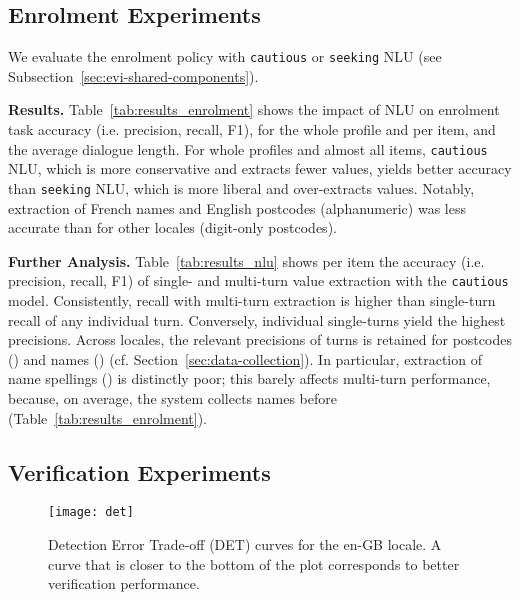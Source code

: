 \documentclass[11pt]{article}
\newcommand{\rparagraph}[1]{\vspace{1.4mm}\noindent\textbf{#1.}}
\begin{document}
{\subsection{Enrolment Experiments}
\label{sec:enrolment-experiments}


We evaluate the enrolment policy with \texttt{cautious} or \texttt{seeking} NLU (see Subsection~\ref{sec:evi-shared-components}).

\rparagraph{Results} Table~\ref{tab:results_enrolment} shows the impact of NLU
on enrolment task accuracy (i.e. precision, recall, F1),
for the whole profile and per item,
and the average dialogue length.
For whole profiles and almost all items,
\texttt{cautious} NLU,
which is more conservative and extracts fewer values,
yields better accuracy than
\texttt{seeking} NLU,
which is more liberal and over-extracts values.
Notably,
extraction of French names and English postcodes (alphanumeric)
was less accurate than for other locales (digit-only postcodes).


\rparagraph{Further Analysis} Table~\ref{tab:results_nlu}
shows {per item the accuracy} (i.e. precision, recall, F1)
of single- and multi-turn value extraction with the \texttt{cautious} model.
Consistently,
recall with multi-turn extraction
is higher than
single-turn recall of any individual turn.
Conversely,
individual single-turns yield the highest precisions.
Across locales,
the relevant precisions of turns
is retained for postcodes () and 
names ()
(cf. Section~\ref{sec:data-collection}).
In particular,
extraction of name spellings () is distinctly poor; this barely affects multi-turn performance,
because, on average, the system collects names before  (Table~\ref{tab:results_enrolment}).








\subsection{Verification Experiments}
\label{sec:verification-experiments}


\begin{figure}[t]
\centering
\texttt{[image: det]}
\caption{
    Detection Error Trade-off (DET) curves
    for the en-GB locale.
    A curve that is closer to the bottom of the plot
    corresponds to better verification performance.
}
\label{fig:det}
\end{figure}

}
\end{document}
